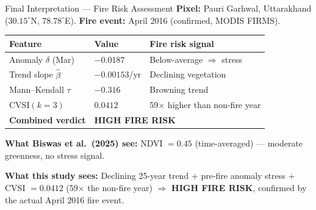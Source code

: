 \documentclass[12pt, a4paper]{article}
\begin{document}
\begin{resultbox}{Final Interpretation --- Fire Risk Assessment}
\textbf{Pixel:} Pauri Garhwal, Uttarakhand ($30.15^{\circ}$N,
$78.78^{\circ}$E).
\textbf{Fire event:} April 2016 (confirmed, MODIS FIRMS).

\medskip
\begin{center}
\begin{tabular}{lll}
\toprule
\textbf{Feature} & \textbf{Value} & \textbf{Fire risk signal} \\
\midrule
Anomaly $\delta$ (Mar) & $-0.0187$ & Below-average $\Rightarrow$ stress \\
Trend slope $\hat{\beta}$ & $-0.00153$/yr & Declining vegetation \\
Mann--Kendall $\tau$ & $-0.316$ & Browning trend \\
CVSI$(k=3)$ & $0.0412$ & 59$\times$ higher than non-fire year \\
\midrule
\textbf{Combined verdict} & \multicolumn{2}{l}{\textbf{HIGH FIRE RISK}} \\
\bottomrule
\end{tabular}
\end{center}

\medskip
\textbf{What Biswas et al.\ (2025) see:}
NDVI $= 0.45$ (time-averaged) --- moderate greenness, no stress signal.

\textbf{What this study sees:}
Declining 25-year trend + pre-fire anomaly stress + CVSI $= 0.0412$
(59$\times$ the non-fire year) $\Rightarrow$ \textbf{HIGH FIRE RISK},
confirmed by the actual April 2016 fire event.
\end{resultbox}

\clearpage



\end{document}

